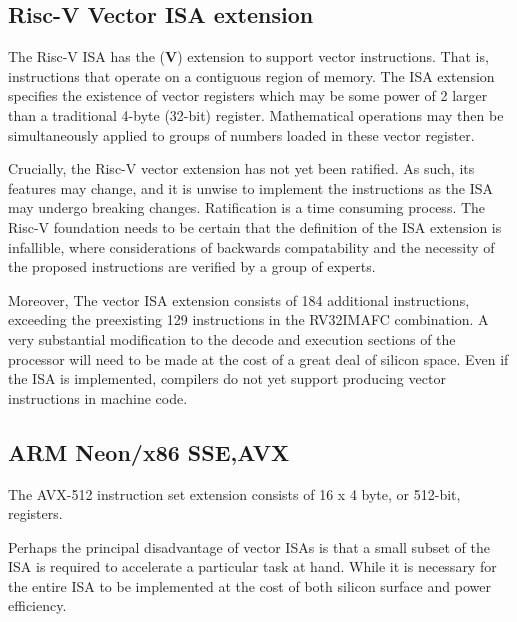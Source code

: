\documentclass[a4paper,8pt]{report}
\begin{document}
\subsection{Risc-V Vector ISA extension}
The Risc-V ISA has the (\textbf{V}) extension to support vector instructions.
That is, instructions that operate on a contiguous region of memory. The ISA
extension specifies the existence of vector registers which may be some power of
2 larger than a traditional 4-byte (32-bit) register. Mathematical operations
may then be simultaneously applied to groups of numbers loaded in these vector
register.

Crucially, the Risc-V vector extension has not yet been ratified. As such, its
features may change, and it is unwise to implement the instructions as the ISA
may undergo breaking changes. Ratification is a time consuming process. The
Risc-V foundation needs to be certain that the definition of the ISA extension
is infallible, where considerations of backwards compatability and the necessity of
the proposed instructions are verified by a group of experts.

Moreover, The vector ISA extension consists of 184
additional instructions, exceeding the preexisting 129 instructions in the
RV32IMAFC combination. A very substantial modification to the decode and
execution sections of the processor will need to be made at the cost of a great
deal of silicon space. Even if the ISA is implemented, compilers do not yet
support producing vector instructions in machine code.


\subsection{ARM Neon/x86 SSE,AVX}
The AVX-512 instruction set extension consists of 16 x 4 byte, or 512-bit,
registers. 

Perhaps the principal disadvantage of vector ISAs is that a small subset of the
ISA is required to accelerate a particular task at hand. While it is necessary
for the entire ISA to be implemented at the cost of both silicon surface and
power efficiency.



\end{document}
